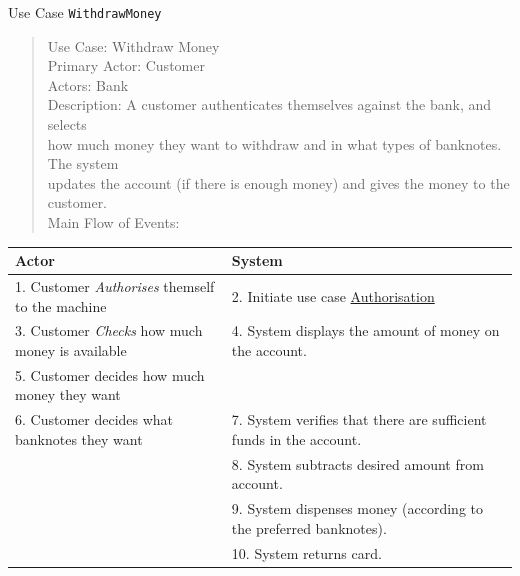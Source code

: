 \documentclass[10pt,t,a4paper]{beamer}
\begin{document}
\begin{frame}[fragile,shrink=40,label=sec-1-14]{Use Case \texttt{WithdrawMoney}}

 \begin{verse}
Use Case: Withdraw Money \\
Primary Actor: Customer \\
Actors: Bank \\
\vspace*{1em}
Description: A customer authenticates themselves against the bank, and selects \\
\hspace*{2em}how much money they want to withdraw and in what types of banknotes. The system \\
\hspace*{2em}updates the account (if there is enough money) and gives the money to the customer. \\
\vspace*{1em}
Main Flow of Events: \\
\end{verse}
\begin{center}
\begin{tabular}{ll}
Actor & System\\
\hline
1. Customer \emph{Authorises} themself to the machine & 2. Initiate use case \uline{Authorisation}\\
3. Customer \emph{Checks} how much money is available & 4. System displays the amount of money on the account.\\
5. Customer decides how much money they want & \\
6. Customer decides what banknotes they want & 7. System verifies that there are sufficient funds in the account.\\
 & 8. System subtracts desired amount from account.\\
 & 9. System dispenses money (according to the preferred banknotes).\\
 & 10. System returns card.\\
\hline
\end{tabular}
\end{center}
\end{frame}
\end{document}
